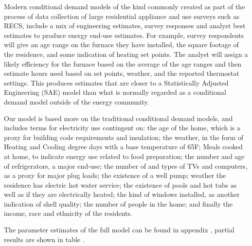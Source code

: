 \documentclass{article}
\begin{document}
  
  
Modern conditional demand models of the kind commonly created as part of the process of data collection of large residential appliance and use surveys such as RECS, include a mix of engineering estimates, survey responses and analyst best estimates to produce energy end-use estimates.  For example, survey respondents will give an age range on the furnace they have installed, the square footage of the residence, and some indication of heating set points.  The analyst will assign a likely efficiency for the furnace based on the average of the age ranges and then estimate hours used based on set points, weather, and the reported thermostat settings.  This produces estimates that are closer to a Statistically Adjusted Engineering (SAE) model than what is normally regarded as a conditional demand model outside of the energy community.

Our model is based more on the traditional conditional demand models, and includes terms for electricity use contingent on: the age of the home, which is a proxy for building code requirements and insulation; the weather, in the form of Heating and Cooling degree days with a base temperature of 65F; Meals cooked at home, to indicate energy use related to food preparation; the number and age of refrigerators, a major end-use;  the number of and types of TVs and computers, as a proxy for major plug loads; the existence of a well pump; weather the residence has electric hot water service; the existence of pools and hot tubs as well as if they are electrically heated; the kind of windows installed, as another indication of shell quality; the number of people in the home; and finally the income, race and ethnicity of the residents.  

The parameter estimates of the full model can be found in appendix 
, partial results are shown in table 
.
  
\end{document}
